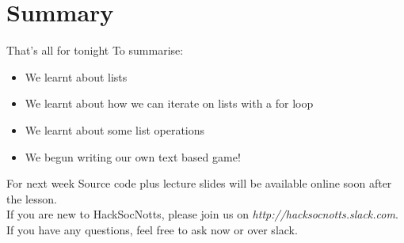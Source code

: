 \documentclass{beamer}
\begin{document}
\section{Summary}

\begin{frame}{That's all for tonight}
  To summarise:
  \pause
  \begin{itemize}
  \item We learnt about lists\pause
  \item We learnt about how we can iterate on lists with a for loop\pause
  \item We learnt about some list operations\pause
  \item We begun writing our own text based game!
  \end{itemize}
\end{frame}

\begin{frame}{For next week}
Source code plus lecture slides will be available online soon after the lesson.\\
If you are new to HackSocNotts, please join us on \textit{http://hacksocnotts.slack.com}.\\
If you have any questions, feel free to ask now or over slack.\\
\end{frame}
\end{document}
